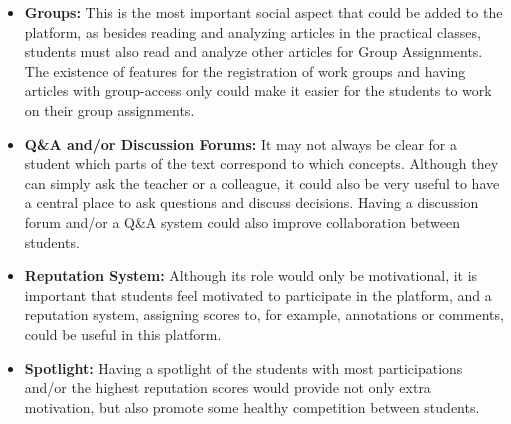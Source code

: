 \begin{itemize}
\item \textbf{Groups:} This is the most important social aspect that could be added to the platform, as besides reading and analyzing articles in the practical classes, students must also read and analyze other articles for Group Assignments. The existence of features for the registration of work groups and having articles with group-access only could make it easier for the students to work on their group assignments.

\item \textbf{Q\&A and/or Discussion Forums:} It may not always be clear for a student which parts of the text correspond to which concepts. Although they can simply ask the teacher or a colleague, it could also be very useful to have a central place to ask questions and discuss decisions. Having a discussion forum and/or a Q\&A system could also improve collaboration between students.

\item \textbf{Reputation System: } Although its role would only be motivational, it is important that students feel motivated to participate in the platform, and a reputation system, assigning scores to, for example, annotations or comments, could be useful in this platform.

\item \textbf{Spotlight: } Having a spotlight of the students with most participations and/or the highest reputation scores would provide not only extra motivation, but also promote some healthy competition between students.
\end{itemize}



